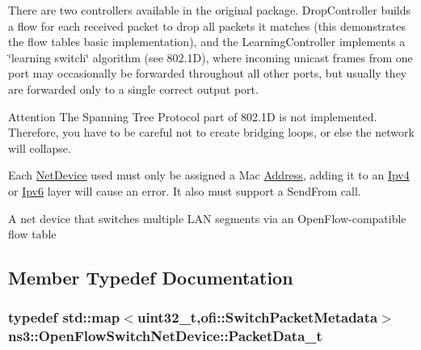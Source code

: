 There are two controllers available in the original package. Drop\+Controller builds a flow for each received packet to drop all packets it matches (this demonstrates the flow table\textquotesingle{}s basic implementation), and the Learning\+Controller implements a \char`\"{}learning switch\char`\"{} algorithm (see 802.\+1D), where incoming unicast frames from one port may occasionally be forwarded throughout all other ports, but usually they are forwarded only to a single correct output port.

\begin{DoxyAttention}{Attention}
The Spanning Tree Protocol part of 802.\+1D is not implemented. Therefore, you have to be careful not to create bridging loops, or else the network will collapse.

Each \hyperlink{classns3_1_1NetDevice}{Net\+Device} used must only be assigned a Mac \hyperlink{classns3_1_1Address}{Address}, adding it to an \hyperlink{classns3_1_1Ipv4}{Ipv4} or \hyperlink{classns3_1_1Ipv6}{Ipv6} layer will cause an error. It also must support a Send\+From call.
\end{DoxyAttention}
A net device that switches multiple L\+AN segments via an Open\+Flow-\/compatible flow table 

\subsection{Member Typedef Documentation}
\subsubsection[{\texorpdfstring{Packet\+Data\+\_\+t}{PacketData_t}}]{\setlength{\rightskip}{0pt plus 5cm}typedef std\+::map$<$uint32\+\_\+t,{\bf ofi\+::\+Switch\+Packet\+Metadata}$>$ {\bf ns3\+::\+Open\+Flow\+Switch\+Net\+Device\+::\+Packet\+Data\+\_\+t}\hspace{0.3cm}{\ttfamily [private]}}\hypertarget{classns3_1_1OpenFlowSwitchNetDevice_aa060d5a2f51e59a59ca58bbc08c0d524}{}\label{classns3_1_1OpenFlowSwitchNetDevice_aa060d5a2f51e59a59ca58bbc08c0d524}
